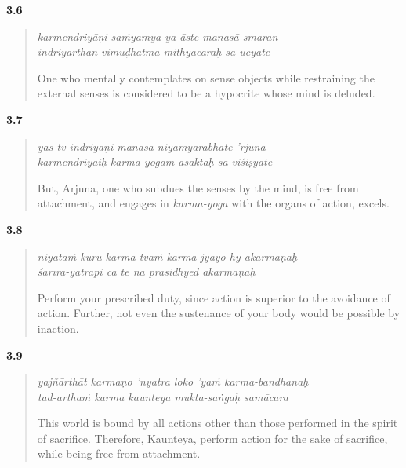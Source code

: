 \par\noindent\textbf{3.6}\par
\begin{verse}
\textit{karmendriyāṇi saṁyamya ya āste manasā smaran} \\
\textit{indriyārthān vimūḍhātmā mithyācāraḥ sa ucyate}

\noindent One who mentally contemplates on sense objects while restraining the external senses is considered to be a hypocrite whose mind is deluded.
\end{verse}
\par



\par\noindent\textbf{3.7}\par
\begin{verse}
\textit{yas tv indriyāṇi manasā niyamyārabhate ’rjuna} \\
\textit{karmendriyaiḥ karma-yogam asaktaḥ sa viśiṣyate}

\noindent But, Arjuna, one who subdues the senses by the mind, is free from attachment, and engages in \textit{karma-yoga} with the organs of action, excels.
\end{verse}
\par



\par\noindent\textbf{3.8}\par
\begin{verse}
\textit{niyataṁ kuru karma tvaṁ karma jyāyo hy akarmaṇaḥ} \\
\textit{śarīra-yātrāpi ca te na prasidhyed akarmaṇaḥ}

\noindent Perform your prescribed duty, since action is superior to the avoidance of action. Further, not even the sustenance of your body would be possible by inaction.
\end{verse}
\par



\par\noindent\textbf{3.9}\par
\begin{verse}
\textit{yajñārthāt karmaṇo ’nyatra loko ’yaṁ karma-bandhanaḥ} \\
\textit{tad-arthaṁ karma kaunteya mukta-saṅgaḥ samācara}

\noindent This world is bound by all actions other than those performed in the spirit of sacrifice. Therefore, Kaunteya, perform action for the sake of sacrifice, while being free from attachment.
\end{verse}
\par



